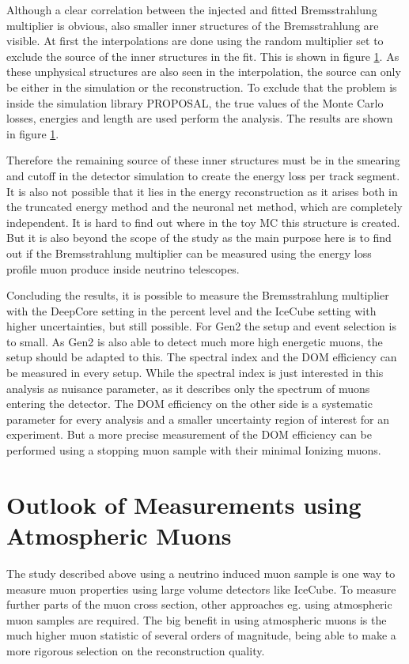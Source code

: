 Although a clear correlation between the injected and fitted Bremsstrahlung multiplier is obvious, also smaller inner structures of the Bremsstrahlung are visible.
At first the interpolations are done using the random multiplier set to exclude the source of the inner structures in the fit.
This is shown in figure \ref{}.
As these unphysical structures are also seen in the interpolation, the source can only be either in the simulation or the reconstruction.
To exclude that the problem is inside the simulation library PROPOSAL, the true values of the Monte Carlo losses, energies and length are used perform the analysis.
The results are shown in figure \ref{}.

Therefore the remaining source of these inner structures must be in the smearing and cutoff in the detector simulation to create the energy loss per track segment.
It is also not possible that it lies in the energy reconstruction as it arises both in the truncated energy method and the neuronal net method, which are completely independent.
It is hard to find out where in the toy MC this structure is created.
But it is also beyond the scope of the study as the main purpose here is to find out if the Bremsstrahlung multiplier can be measured using the energy loss profile muon produce inside neutrino telescopes.

Concluding the results, it is possible to measure the Bremsstrahlung multiplier with the DeepCore setting in the percent level and the IceCube setting with higher uncertainties, but still possible.
For Gen2 the setup and event selection is to small.
As Gen2 is also able to detect much more high energetic muons, the setup should be adapted to this.
The spectral index and the DOM efficiency can be measured in every setup.
While the spectral index is just interested in this analysis as nuisance parameter, as it describes only the spectrum of muons entering the detector.
The DOM efficiency on the other side is a systematic parameter for every analysis and a smaller uncertainty region of interest for an experiment.
But a more precise measurement of the DOM efficiency can be performed using a stopping muon sample with their minimal Ionizing muons.

\section{Outlook of Measurements using Atmospheric Muons}

The study described above using a neutrino induced muon sample is one way to measure muon properties using large volume detectors like IceCube.
To measure further parts of the muon cross section, other approaches eg. using atmospheric muon samples are required.
The big benefit in using atmospheric muons is the much higher muon statistic of several orders of magnitude, being able to make a more rigorous selection on the reconstruction quality.

